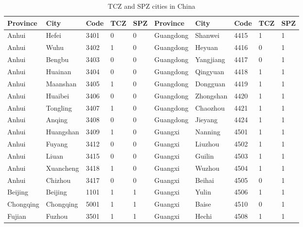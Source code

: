 \documentclass[12pt]{article}
\begin{document}
\begin{table}[!htbp] \centering
  \caption{TCZ and SPZ cities in China}
  \begin{adjustbox}{width=\textwidth, totalheight=\baselineskip,keepaspectratio}
    \label{tab:appendix1}
\begin{tabular}{llllllllll}
\hline
Province  & City      & Code & TCZ & SPZ & Province     & City          & Code & TCZ & SPZ \\
\hline
Anhui     & Hefei     & 3401 & 0   & 0   & Guangdong    & Shanwei       & 4415 & 1   & 1   \\
Anhui     & Wuhu      & 3402 & 1   & 0   & Guangdong    & Heyuan        & 4416 & 0   & 1   \\
Anhui     & Bengbu    & 3403 & 0   & 0   & Guangdong    & Yangjiang     & 4417 & 0   & 1   \\
Anhui     & Huainan   & 3404 & 0   & 0   & Guangdong    & Qingyuan      & 4418 & 1   & 1   \\
Anhui     & Maanshan  & 3405 & 1   & 0   & Guangdong    & Dongguan      & 4419 & 1   & 1   \\
Anhui     & Huaibei   & 3406 & 0   & 0   & Guangdong    & Zhongshan     & 4420 & 1   & 1   \\
Anhui     & Tongling  & 3407 & 1   & 0   & Guangdong    & Chaozhou      & 4421 & 1   & 1   \\
Anhui     & Anqing    & 3408 & 0   & 0   & Guangdong    & Jieyang       & 4424 & 1   & 1   \\
Anhui     & Huangshan & 3409 & 1   & 0   & Guangxi      & Nanning       & 4501 & 1   & 1   \\
Anhui     & Fuyang    & 3412 & 0   & 0   & Guangxi      & Liuzhou       & 4502 & 1   & 1   \\
Anhui     & Liuan     & 3415 & 0   & 0   & Guangxi      & Guilin        & 4503 & 1   & 1   \\
Anhui     & Xuancheng & 3418 & 1   & 0   & Guangxi      & Wuzhou        & 4504 & 1   & 1   \\
Anhui     & Chizhou   & 3417 & 0   & 0   & Guangxi      & Beihai        & 4505 & 0   & 1   \\
Beijing   & Beijing   & 1101 & 1   & 1   & Guangxi      & Yulin         & 4506 & 1   & 1   \\
Chongqing & Chongqing & 5001 & 1   & 1   & Guangxi      & Baise         & 4510 & 0   & 1   \\
Fujian    & Fuzhou    & 3501 & 1   & 1   & Guangxi      & Hechi         & 4508 & 1   & 1   \\

\end{tabular}
\end{adjustbox}
\end{table}
\end{document}
